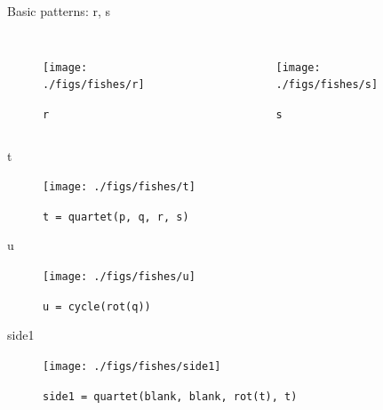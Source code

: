 \documentclass{beamer}
\begin{document}
    \begin{frame}{Basic patterns: r, s}
        \begin{columns}[T,onlytextwidth]
                \begin{figure}
                    \centering
                    \texttt{[image: ./figs/fishes/r]}
                    \caption{\texttt{r}}
                    \label{fig:r}
                \end{figure}

                \begin{figure}
                    \centering
                    \texttt{[image: ./figs/fishes/s]}
                    \caption{\texttt{s}}
                    \label{fig:s}
                \end{figure}
        \end{columns}

    \end{frame}

    \begin{frame}{t}

        \begin{figure}
            \centering
            \texttt{[image: ./figs/fishes/t]}
            \caption{\texttt{t = quartet(p, q, r, s)}}
            \label{fig:t}
        \end{figure}

    \end{frame}

    \begin{frame}{u}

        \begin{figure}
            \centering
            \texttt{[image: ./figs/fishes/u]}
            \caption{\texttt{u = cycle(rot(q))}}
            \label{fig:u}
        \end{figure}

    \end{frame}

    \begin{frame}{side1}

        \begin{figure}
            \centering
            \texttt{[image: ./figs/fishes/side1]}
            \caption{\texttt{side1 = quartet(blank, blank, rot(t), t)}}
            \label{fig:side1}
        \end{figure}

    \end{frame}
\end{document}
